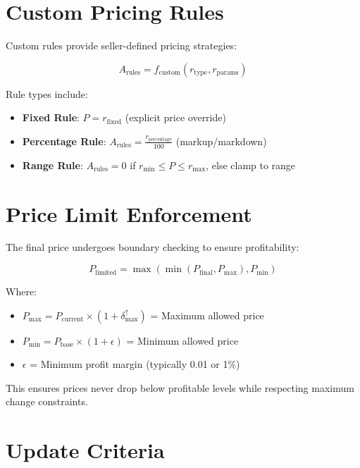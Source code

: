 \documentclass[12pt,a4paper,oneside]{report}
\begin{document}
\section{Custom Pricing Rules}

Custom rules provide seller-defined pricing strategies:

\begin{equation}
A_{\text{rules}} = f_{\text{custom}}(r_{\text{type}}, r_{\text{params}})
\end{equation}

Rule types include:

\begin{itemize}
    \item \textbf{Fixed Rule}: $P = r_{\text{fixed}}$ (explicit price override)
    \item \textbf{Percentage Rule}: $A_{\text{rules}} = \frac{r_{\text{percentage}}}{100}$ (markup/markdown)
    \item \textbf{Range Rule}: $A_{\text{rules}} = 0$ if $r_{\text{min}} \leq P \leq r_{\text{max}}$, else clamp to range
\end{itemize}

\section{Price Limit Enforcement}

The final price undergoes boundary checking to ensure profitability:

\begin{equation}
P_{\text{limited}} = \max(\min(P_{\text{final}}, P_{\text{max}}), P_{\text{min}})
\end{equation}

Where:
\begin{itemize}
    \item $P_{\text{max}} = P_{\text{current}} \times (1 + \delta_{\text{max}}^{\uparrow})$ = Maximum allowed price
    \item $P_{\text{min}} = P_{\text{base}} \times (1 + \epsilon)$ = Minimum allowed price
    \item $\epsilon$ = Minimum profit margin (typically 0.01 or 1\%)
\end{itemize}

This ensures prices never drop below profitable levels while respecting maximum change constraints.

\section{Update Criteria}
\end{document}
